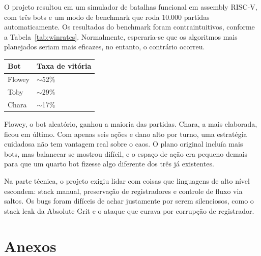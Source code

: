 \documentclass[AMA,twocolumn]{USG}
\begin{document}
O projeto resultou em um simulador de batalhas funcional em assembly RISC-V, com três bots e um modo de benchmark que roda 10.000 partidas automaticamente.
Os resultados do benchmark foram contraintuitivos, conforme a Tabela~\ref{tab:winrates}. Normalmente, esperaria-se que os algoritmos mais 
planejados seriam mais eficazes, no entanto, o contrário ocorreu.

\vspace{4pt}\noindent
{\renewcommand{\arraystretch}{1.5}
\begin{tabular}{ll}
\hline
\textbf{Bot} & \textbf{Taxa de vitória} \\
\hline
Flowey & $\sim$52\% \\
Toby   & $\sim$29\% \\
Chara  & $\sim$17\% \\
\hline
\end{tabular}}\label{tab:winrates}
\vspace{4pt}

Flowey, o bot aleatório, ganhou a maioria das partidas. Chara, a mais elaborada, ficou em último. Com apenas seis ações e dano alto por turno, uma estratégia cuidadosa não tem vantagem real sobre o caos. O plano original incluía mais bots, mas balancear se mostrou difícil, e o espaço de ação era pequeno demais para que um quarto bot fizesse algo diferente dos três já existentes.

Na parte técnica, o projeto exigiu lidar com coisas que linguagens de alto nível escondem: stack manual, preservação de registradores e controle de fluxo via saltos. Os bugs foram difíceis de achar justamente por serem silenciosos, como o stack leak da Absolute Grit e o ataque que curava por corrupção de registrador.

\section{Anexos}



\end{document}
